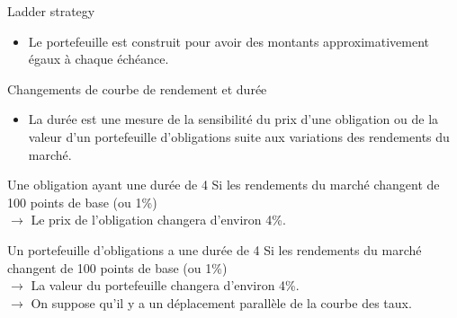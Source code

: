 \documentclass[10pt,a4paper]{beamer}
\begin{document}
\begin{frame}{Ladder strategy}
\begin{itemize}[label=\bullet]
\item Le portefeuille est construit pour avoir des montants approximativement égaux à chaque échéance.
\end{itemize}

\vspace{1cm}

\begin{center}

   \end{center}
\end{frame}

\begin{frame}{Changements de courbe de rendement et durée}
\begin{itemize}[label=\bullet]
\item La durée est une mesure de la sensibilité du prix d'une obligation ou de la valeur d'un portefeuille d'obligations suite aux variations des rendements du marché.
\end{itemize}
\begin{block}{Une obligation ayant une durée de 4}
Si les rendements du marché changent de 100 points de base (ou 1\%)\\
$\rightarrow$ Le prix de l'obligation changera d'environ 4\%.
\end{block}
\begin{block}{Un portefeuille d'obligations a une durée de 4}
Si les rendements du marché changent de 100 points de base (ou 1\%)\\
$\rightarrow$ La valeur du portefeuille changera d'environ 4\%.\\
$\rightarrow$ On suppose qu'il y a un déplacement parallèle de la courbe des taux.
\end{block}
\end{frame}
\end{document}
